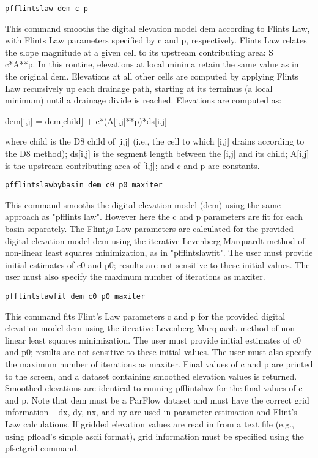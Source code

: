 \begin{description}
\item{\begin{verbatim}pfflintslaw dem c p\end{verbatim}}
This command smooths the digital elevation model dem according to Flints Law, with
Flints Law parameters specified by c and p, respectively. Flints Law relates the 
slope magnitude at a given cell to its upstream contributing area: S = c*A**p. In 
this routine, elevations at local minima retain the same value as in the original 
dem. Elevations at all other cells are computed by applying Flints Law recursively 
up each drainage path, starting at its terminus (a local minimum) until a drainage 
divide is reached. Elevations are computed as: 

dem[i,j] = dem[child] + c*(A[i,j]**p)*ds[i,j]

where child is the D8 child of [i,j] (i.e., the cell to which [i,j] drains according
to the D8 method); ds[i,j] is the segment length between the [i,j] and its child; 
A[i,j] is the upstream contributing area of [i,j]; and c and p are constants.


\item{\begin{verbatim}pfflintslawbybasin dem c0 p0 maxiter\end{verbatim}}
This command smooths the digital elevation model (dem) using  the same approach
as "pfflints law". However here the c and p parameters are fit for each basin separately.  
The Flint¿s Law parameters are calculated for the provided digital elevation model dem 
using the iterative Levenberg-Marquardt method of non-linear least squares minimization, 
as in "pfflintslawfit". The user must provide initial estimates of c0 and p0; results are
not sensitive to these initial values. The user must also specify the maximum number of 
iterations as maxiter.

\item{\begin{verbatim}pfflintslawfit dem c0 p0 maxiter\end{verbatim}}
This command fits Flint's Law parameters c and p for the provided digital elevation 
model dem using the iterative Levenberg-Marquardt method of non-linear least squares 
minimization. The user must provide initial estimates of c0 and p0; results are not
sensitive to these initial values. The user must also specify the maximum number of 
iterations as maxiter. Final values of c and p are printed to the screen, and a 
dataset containing smoothed elevation values is returned. Smoothed elevations are 
identical to running pfflintslaw for the final values of c and p. Note that dem 
must be a ParFlow dataset and must have the correct grid information -- dx, dy, nx, 
and ny are used in parameter estimation and Flint's Law calculations. If gridded 
elevation values are read in from a text file (e.g., using pfload's simple ascii 
format), grid information must be specified using the pfsetgrid command. 


\end{description}
